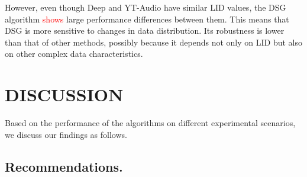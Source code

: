 \documentclass[sigconf, nonacm]{acmart}
\begin{document}
However, even though Deep and YT-Audio have similar LID values, the DSG algorithm \textcolor{red}{shows} large performance differences between them. This means that DSG is more sensitive to changes in data distribution. Its robustness is lower than that of other methods, possibly because it depends not only on LID but also on other complex data characteristics.
%	
	
	\section{DISCUSSION}
	Based on the performance of the algorithms on different experimental scenarios, we discuss our findings as follows.
	
	
	\subsection{Recommendations.}
	
\end{document}
